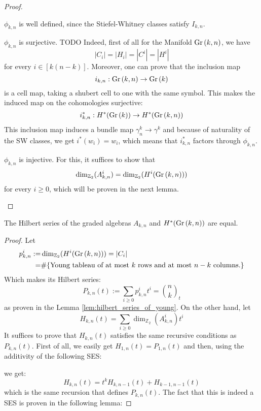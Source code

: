 \begin{proof}\begin{b_item}
\item $\phi_{k,n}$ is well defined, since the Stiefel-Whitney classes satisfy $I_{k,n}$.
\item $\phi_{k,n}$ is surjective. TODO Indeed, first of all for the Manifold $\Gr{k}{n}$, we have
\[|C_i|=|H_i|=|C^i|=|H^i|\]
for every $i\in[k(n-k)]$. Moreover, one can prove that the inclusion map
\[i_{k,n}:\Gr{k}{n}\to\Gr{k}\] is a cell map, taking a shubert cell to one with the same symbol. This makes the induced map on the cohomologies surjective:
\[i^*_{k,n}:H^*(\Gr{k})\to H^*(\Gr{k}{n})\] This inclusion map induces a bundle map $\gamma^k_n\to\gamma^k$ and because of naturality of the SW classes, we get $i^*(w_i)=w_i$, which means that $i^*_{k,n}$ factors through $\phi_{k,n}$.
\item $\phi_{k,n}$ is injective. For this, it suffices to show that
\[\dim_{\mathbb{Z}_2}(A_{k,n}^i)=\dim_{\mathbb{Z}_2}(H^i(\Gr{k}{n}))\] for every $i\geq0$, which will be proven in the next lemma.
\end{b_item}
\end{proof}
\begin{lemma} The Hilbert series of the graded algebras $A_{k,n}$ and $H^*(\Gr{k}{n})$ are equal.
\end{lemma}
\begin{proof} Let
\begin{align*}
p_{k,n}^i:=&\dim_{\mathbb{Z}_2}(H^i(\Gr{k}{n}))=|C_i|\\
=&\#\{\text{Young tableau of at most }k\text{ rows and at most }n-k\text{ columns.}\}
\end{align*}
Which makes its Hilbert series:
\[P_{k,n}(t):=\sum_{i\geq0}p_{k,n}^it^i=\binom{n}{k}_t\]
as proven in the Lemma \ref{lem:hilbert_series_of_young}. On the other hand, let
\[H_{k,n}(t)=\sum_{i\geq0}\dim_{\mathbb{Z}_2}(A_{k,n}^i)t^i\]
It suffices to prove that $H_{k,n}(t)$ satisfies the same recursive conditions as $P_{k,n}(t)$. First of all, we easily get $H_{1,n}(t)=P_{1,n}(t)$ and then, using the additivity of the following SES:
\begin{center}
\end{center}
we get:
\[H_{k,n}(t)=t^kH_{k,n-1}(t)+H_{k-1,n-1}(t)\]
which is the same recursion that defines $P_{k,n}(t)$. The fact that this is indeed a SES is proven in the following lemma:
\end{proof}
